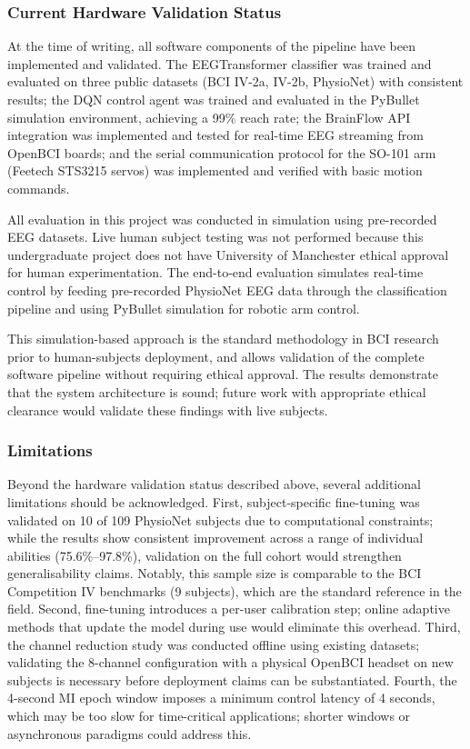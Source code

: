 \documentclass[12pt, a4paper]{article}
\begin{document}
\subsubsection{Current Hardware Validation Status}

At the time of writing, all software components of the pipeline have been implemented and validated. The EEGTransformer classifier was trained and evaluated on three public datasets (BCI IV-2a, IV-2b, PhysioNet) with consistent results; the DQN control agent was trained and evaluated in the PyBullet simulation environment, achieving a 99\% reach rate; the BrainFlow API integration was implemented and tested for real-time EEG streaming from OpenBCI boards; and the serial communication protocol for the SO-101 arm (Feetech STS3215 servos) was implemented and verified with basic motion commands.

All evaluation in this project was conducted in simulation using pre-recorded EEG datasets. Live human subject testing was not performed because this undergraduate project does not have University of Manchester ethical approval for human experimentation. The end-to-end evaluation simulates real-time control by feeding pre-recorded PhysioNet EEG data through the classification pipeline and using PyBullet simulation for robotic arm control.

This simulation-based approach is the standard methodology in BCI research prior to human-subjects deployment, and allows validation of the complete software pipeline without requiring ethical approval. The results demonstrate that the system architecture is sound; future work with appropriate ethical clearance would validate these findings with live subjects.

\subsubsection{Limitations}
\label{sec:disc_limitations}

Beyond the hardware validation status described above, several additional limitations should be acknowledged. First, subject-specific fine-tuning was validated on 10 of 109 PhysioNet subjects due to computational constraints; while the results show consistent improvement across a range of individual abilities (75.6\%--97.8\%), validation on the full cohort would strengthen generalisability claims. Notably, this sample size is comparable to the BCI Competition IV benchmarks (9 subjects), which are the standard reference in the field. Second, fine-tuning introduces a per-user calibration step; online adaptive methods that update the model during use would eliminate this overhead. Third, the channel reduction study was conducted offline using existing datasets; validating the 8-channel configuration with a physical OpenBCI headset on new subjects is necessary before deployment claims can be substantiated. Fourth, the 4-second MI epoch window imposes a minimum control latency of 4 seconds, which may be too slow for time-critical applications; shorter windows or asynchronous paradigms could address this.
\end{document}
